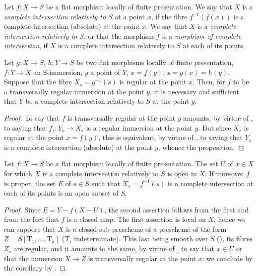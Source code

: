\begin{definition}[19.3.6]
\label{IV.19.3.6}
Let $f:X\to S$ be a flat morphism locally of finite presentation.
We say that $X$ is a \emph{complete intersection relatively to $S$} at a point $x$, if the fibre $f^{-1}(f(x))$ is a complete intersection (absolute) at the point $x$.
We say that $X$ is a \emph{complete intersection relatively to $S$}, or that the morphism $f$ is a \emph{morphism of complete intersection}, if $X$ is a complete intersection relatively to $S$ at each of its points.
\end{definition}

\begin{proposition}[19.3.7]
\label{IV.19.3.7}
Let $g:X\to S$, $h:Y\to S$ be two flat morphisms locally of finite presentation, $f:Y\to X$ an S-immersion, $y$ a point of $Y$, $x=f(y)$, $s=g(x)=h(y)$.
Suppose that the fibre $X_s=g^{-1}(s)$ is regular at the point $x$.
Then, for $f$ to be a transversally regular immersion at the point $y$, it is necessary and sufficient that $Y$ be a complete intersection relatively to $S$ at the point $y$.
\end{proposition}

\begin{proof}
To say that $f$ is transversally regular at the point $y$ amounts, by virtue of , to saying that $f_s:Y_s\to X_s$ is a regular immersion at the point $y$.
But since $X_s$ is regular at the point $x=f(y)$, this is equivalent, by virtue of , to saying that $Y_s$ is a complete intersection (absolute) at the point $y$, whence the proposition.
\end{proof}

\begin{corollary}[19.3.8]
\label{IV.19.3.8}
Let $f:X\to S$ be a flat morphism locally of finite presentation.
The set $U$ of $x\in X$ for which $X$ is a complete intersection relatively to $S$ is open in $X$.
If moreover $f$ is proper, the set $E$ of $s\in S$ such that $X_s=f^{-1}(s)$ is a complete intersection at each of its points is an open subset of $S$.
\end{corollary}

\begin{proof}
Since $E=Y-f(X-U)$, the second assertion follows from the first and from the fact that $f$ is a closed map.
The first assertion is local on $X$, hence we can suppose that $X$ is a closed sub-prescheme of a prescheme of the form $Z=S[\mathrm{T}_1,\ldots,\mathrm{T}_n]$ ($\mathrm{T}_i$ indeterminate).
This last being smooth over $S$ (), its fibres $Z_s$ are regular, and it amounts to the same, by virtue of , to say that $x\in U$ or that the immersion $X\to Z$ is transversally regular at the point $x$; we conclude by the corollary by .
\end{proof}

